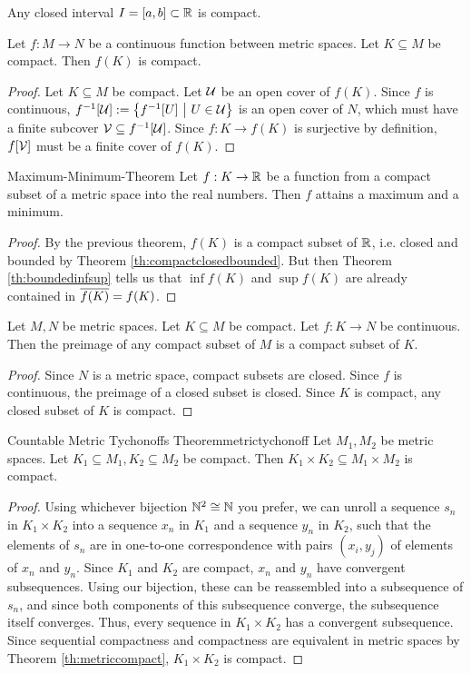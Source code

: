 \begin{theorem}
	\label{th:compactinterval}
	Any closed interval $I = [a,b] \subset \mathbb{R}$ is compact.
\end{theorem}
\begin{theorem}{}{}
	Let $f : M \to N$ be a continuous function between metric spaces. Let $K \subseteq M$ be compact. Then $f(K)$ is compact.
\end{theorem}
\begin{proof}
	Let $K \subseteq M$ be compact. Let $\mathcal{U}$ be an open cover of $f(K)$. Since $f$ is continuous, $f^{-1}[\mathcal{U}] := \qty{f^{-1}[U] ~\middle|~U \in \mathcal{U}}$ is an open cover of $N$, which must have a finite subcover $\mathcal{V} \subseteq f^{-1}[\mathcal{U}]$. Since $f : K \to f(K)$ is surjective by definition, $f[\mathcal{V}]$ must be a finite cover of $f(K)$.
\end{proof}
\begin{importantcorollary}{Maximum-Minimum-Theorem}{}
	Let $f : K \to \mathbb{R}$ be a function from a compact subset of a metric space into the real numbers. Then $f$ attains a maximum and a minimum.
\end{importantcorollary}
\begin{proof}
	By the previous theorem, $f(K)$ is a compact subset of $\mathbb{R}$, i.e. closed and bounded by Theorem \ref{th:compactclosedbounded}. But then Theorem \ref{th:boundedinfsup} tells us that $\inf f(K)$ and $\sup f(K)$ are already contained in $\overline{{f(K)}} = f(K)$.
\end{proof}
\begin{lemma}
	Let $M,N$ be metric spaces. Let $K \subseteq M$ be compact. Let $f : K \to N$ be continuous. Then the preimage of any compact subset of $M$ is a compact subset of $K$.
\end{lemma}
\begin{proof}
	Since $N$ is a metric space, compact subsets are closed. Since $f$ is continuous, the preimage of a closed subset is closed. Since $K$ is compact, any closed subset of $K$ is compact.
\end{proof}
\begin{importanttheorem}{Countable Metric Tychonoffs Theorem}{metrictychonoff}
	Let $M_1, M_2$ be metric spaces. Let $K_1 \subseteq M_1, K_2 \subseteq M_2$ be compact. Then $K_1 \times K_2 \subseteq M_1 \times M_2$ is compact.
\end{importanttheorem}
\begin{proof}
	Using whichever bijection $\mathbb{N}^2 \cong \mathbb{N}$ you prefer, we can unroll a sequence $s_n$ in $K_1 \times K_2$ into a sequence $x_n$ in $K_1$ and a sequence $y_n$ in $K_2$, such that the elements of $s_n$ are in one-to-one correspondence with pairs $(x_i, y_j)$ of elements of $x_n$ and $y_n$. Since $K_1$ and $K_2$ are compact, $x_n$ and $y_n$ have convergent subsequences. Using our bijection, these can be reassembled into a subsequence of $s_n$, and since both components of this subsequence converge, the subsequence itself converges. Thus, every sequence in $K_1 \times K_2$ has a convergent subsequence. Since sequential compactness and compactness are equivalent in metric spaces by Theorem \ref{th:metriccompact}, $K_1 \times K_2$ is compact.
\end{proof}
